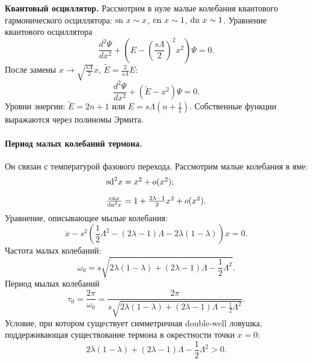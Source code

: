 \documentclass[12pt]{article}
\begin{document}
\textbf{Квантовый осциллятор.}
Рассмотрим в нуле малые колебания квантового гармонического осциллятора: $\textrm{sn}~x \sim x$, $\textrm{cn}~x \sim 1$, $\textrm{dn}~x \sim 1$.
Уравнение квантового осциллятора
%
\begin{equation}
\frac{d^2 \Psi}{dx^2} + (E - \left( \frac{s \Lambda}{2} \right)^2 x^2) \Psi = 0.
\end{equation}
%
После замены $x \to \sqrt{\frac{s \Lambda}{2}} x$, $\tilde{E} = \frac{2}{s \Lambda} E$:
%
\begin{equation}
\frac{d^2 \Psi}{dx^2} + (\tilde{E} - x^2) \Psi = 0.
\end{equation}
%
Уровни энергии: $\tilde{E} = 2n + 1$ или $E = s \Lambda (n + \frac{1}{2})$.
Собственные функции выражаются через полиномы Эрмита.

\paragraph{Период малых колебаний термона.}
Он связан с температурой фазового перехода.
Рассмотрим малые колебания в яме:
%
\begin{equation}
\begin{array}{l}
	\textrm{sd}^2 x = x^2 + o(x^2); \\[10pt]
	\frac{\textrm{cn} x}{\textrm{dn}^2 x} = 1 + \frac{2\lambda - 1}{2} x^2 + o(x^2).
\end{array}
\end{equation}
%
Уравнение, описывающее мылые колебания:
%
\begin{equation}
\ddot{x} - s^2 \left( \frac{1}{2} \Lambda^2 - (2\lambda - 1)\Lambda - 2 \lambda (1 - \lambda) \right) x = 0.
\end{equation}
%
Частота малых колебаний:
%
\begin{equation}
\omega_0 = s \sqrt{2 \lambda (1 - \lambda) + (2\lambda - 1)\Lambda - \frac{1}{2} \Lambda^2}.
\end{equation}
%
Период мылых колебаний
%
\begin{equation}
\tau_0 = \frac{2 \pi}{\omega_0} = \frac{2 \pi}{s \sqrt{2 \lambda (1 - \lambda) + (2\lambda - 1)\Lambda - \frac{1}{2} \Lambda^2}}.
\end{equation}
%
Условие, при котором существует симметричная double-well ловушка, поддерживающая существование термона в окрестности точки $x = 0$:
%
\begin{equation}
2 \lambda (1 - \lambda) + (2\lambda - 1)\Lambda - \frac{1}{2} \Lambda^2 > 0.
\end{equation}
%
\end{document}
